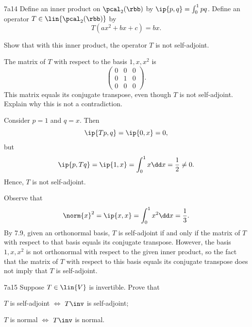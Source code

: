 \begin{exercise}{7a14}
    Define an inner product on $\pcal_2(\rbb)$ by $\ip{p, q} = \int_0^1 pq$.
    Define an operator $T \in \lin{\pcal_2(\rbb)}$ by
    \[
        T(ax^2 + bx + c) = bx.
    \]
    \begin{subexercises}
        \item Show that with this inner product, the operator $T$ is not self-adjoint.
        \item The matrix of $T$ with respect to the basis $1, x, x^2$ is
        \[
            \begin{pmatrix}
                0 & 0 & 0 \\
                0 & 1 & 0 \\
                0 & 0 & 0
            \end{pmatrix}.
        \]
        This matrix equals its conjugate transpose, even though $T$ is not self-adjoint.
        Explain why this is not a contradiction.
    \end{subexercises}
\end{exercise}

\begin{solenum}
    \item Consider $p = 1$ and $q = x$. Then
    \[
        \ip{Tp, q} = \ip{0, x} = 0,
    \]
    but
    \[
        \ip{p, Tq} = \ip{1, x} = \int_0^1 x \dd x = \frac{1}{2} \neq 0.
    \]
    Hence, $T$ is not self-adjoint.
    \item Observe that
    \[
        \norm{x}^2 = \ip{x, x} = \int_0^1 x^2 \dd x = \frac{1}{3}.
    \]
    By 7.9, given an orthonormal basis, $T$ is self-adjoint if and only if the matrix of $T$ with respect to that basis equals its conjugate transpose.
    However, the basis $1, x, x^2$ is not orthonormal with respect to the given inner product, so the fact that the matrix of $T$ with respect to this basis equals its conjugate transpose does not imply that $T$ is self-adjoint.
\end{solenum}

\begin{exercise}{7a15}
    Suppose $T \in \lin{V}$ is invertible.
    Prove that
    \begin{subexercises}
        \item $T$ is self-adjoint $\iff$ $T\inv$ is self-adjoint;
        \item $T$ is normal $\iff$ $T\inv$ is normal.
    \end{subexercises}
\end{exercise}

